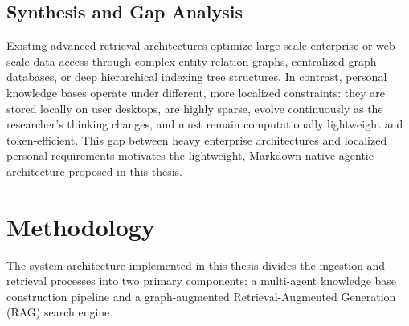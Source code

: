 \documentclass[runningheads]{llncs}
\begin{document}
\subsection{Synthesis and Gap Analysis}
Existing advanced retrieval architectures optimize large-scale enterprise or web-scale data access through complex entity relation graphs, centralized graph databases, or deep hierarchical indexing tree structures. In contrast, personal knowledge bases operate under different, more localized constraints: they are stored locally on user desktops, are highly sparse, evolve continuously as the researcher's thinking changes, and must remain computationally lightweight and token-efficient. This gap between heavy enterprise architectures and localized personal requirements motivates the lightweight, Markdown-native agentic architecture proposed in this thesis.


\section{Methodology}
\label{sec:methodology}

The system architecture implemented in this thesis divides the ingestion and retrieval processes into two primary components: a multi-agent knowledge base construction pipeline and a graph-augmented Retrieval-Augmented Generation (RAG) search engine.
\end{document}
